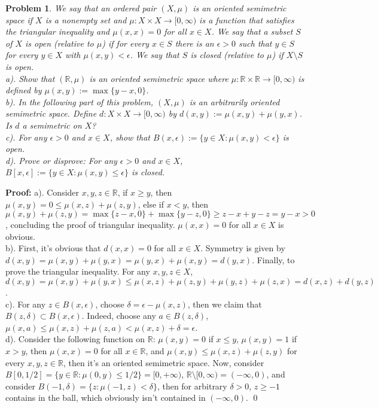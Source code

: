 \documentclass[12pt]{article}
\newtheorem{problem}{Problem}
\begin{document}
\begin{problem}
We say that an ordered pair $(X, \mu)$ is an oriented semimetric space if $X$ is a nonempty set and $\mu: X\times X\to [0,\infty)$ is a function that satisfies the triangular inequality and $\mu(x,x)=0$ for all $x\in X$. We say that a subset $S$ of $X$ is open (relative to $\mu$) if for every $x\in S$ there is an $\epsilon>0$ such that $y\in S$ for every $y\in X$ with $\mu(x,y)<\epsilon$. We say that $S$ is closed (relative to $\mu$) if $X\setminus S$ is open. \\
\indent a). Show that $(\mathbb{R}, \mu)$ is an oriented semimetric space where $\mu: \mathbb{R}\times\mathbb{R}\to [0,\infty)$ is defined by $\mu(x,y):= \max\{y-x,0\}$. \\
\indent b). In the following part of this problem, $(X,\mu)$ is an arbitrarily oriented semimetric space. Define $d: X\times X\to [0,\infty)$ by $d(x,y):= \mu(x,y)+\mu(y,x)$. Is $d$ a semimetric on $X$? \\
\indent c). For any $\epsilon>0$ and $x\in X$, show that $B(x,\epsilon):= \{y\in X: \mu(x,y)<\epsilon\}$ is open. \\
\indent d). Prove or disprove: For any $\epsilon >0$ and $x\in X$, $B[x,\epsilon]:=\{y\in X: \mu(x,y)\leq\epsilon\}$ is closed.
\end{problem}

\textbf{Proof:} a). Consider $x,y,z\in\mathbb{R}$, if $x\geq y$, then $\mu(x,y)=0\leq \mu(x,z)+\mu(z,y)$, else if $x < y$, then $\mu(x,y)+\mu(z,y)=\max\{z-x, 0\}+\max\{y-z, 0\}\geq z-x+y-z=y-x>0$, concluding the proof of triangular inequality. $\mu(x,x)=0$ for all $x\in X$ is obvious. 
\\
\indent b). First, it's obvious that $d(x,x) = 0$ for all $x\in X$. Symmetry is given by $d(x,y) = \mu(x,y)+\mu(y,x) = \mu(y,x)+\mu(x,y)=d(y,x)$. Finally, to prove the triangular inequality. For any $x,y,z\in X$, $d(x,y)=\mu(x,y)+\mu(y,x)\leq \mu(x,z)+\mu(z, y)+\mu(y, z) +\mu(z, x)=d(x,z)+d(y,z)$. \\
\indent c). For any $z\in B(x,\epsilon)$, choose $\delta=\epsilon-\mu(x,z)$, then we claim that $B(z,\delta)\subset B(x,\epsilon)$. Indeed, choose any $a\in B(z,\delta)$, $\mu(x, a)\leq\mu(x,z)+\mu(z,a)< \mu(x,z) + \delta=\epsilon$. \\
\indent d). Consider the following function on $\mathbb{R}$: $\mu(x,y)=0$ if $x\leq y$, $\mu(x,y)=1$ if $x>y$, then $\mu(x,x)=0$ for all $x\in \mathbb{R}$, and $\mu(x,y)\leq\mu(x,z)+\mu(z,y)$ for every $x,y,z\in \mathbb{R}$, then it's an oriented semimetric space. Now, consider $B[0, 1/2]=\{y\in\mathbb{R}: \mu(0, y)\leq 1/2\}=[0, +\infty)$, $\mathbb{R}\setminus [0, \infty)=(-\infty, 0)$, and consider $B(-1,\delta) = \{z: \mu(-1,z)<\delta\}$, then for arbitrary $\delta>0$, $z\geq -1$ contains in the ball, which obviously isn't contained in $(-\infty,0)$. \qed
\end{document}

